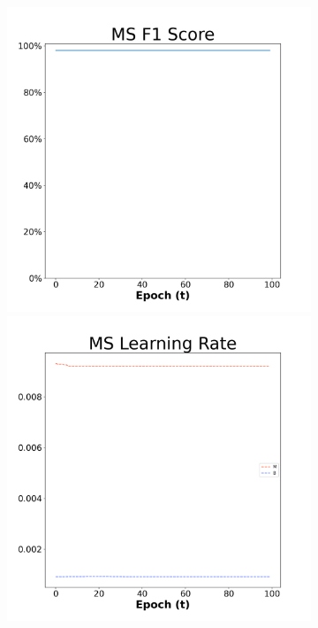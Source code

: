 \begin{figure}[H]
    \centering %
\begin{subfigure}{0.3\textwidth}
  \includegraphics[width=\linewidth]{images/exper2/breast/MS_0.01_f1.png}
    \includegraphics[width=\linewidth]{images/exper2/breast/MS_0.01_lr.png}

\end{subfigure}
\end{figure}
